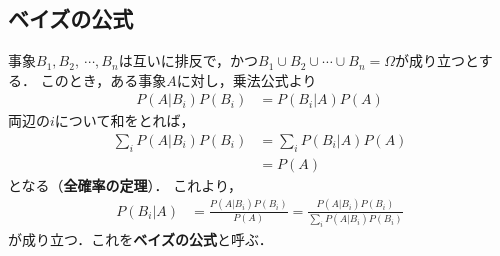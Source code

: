 %


\subsection{ベイズの公式}
%
事象$ B_{1}, B_{2},\ \cdots, B_{n} $は互いに排反で，かつ$ B_{1}\cup B_{2} \cup \cdots \cup B_{n} = \Omega $が成り立つとする．
%
このとき，ある事象$ A $に対し，乗法公式より
%
\begin{align*}
	P(A|B_{i})P(B_{i}) &= P(B_{i}|A)P(A)
\end{align*}
%
両辺の$ i $について和をとれば，
%
\begin{align*}
	\sum_{i} P(A|B_{i})P(B_{i}) &= \sum_{i} P(B_{i}|A)P(A) \\
	                            &= P(A)
\end{align*}
%
となる（\textbf{全確率の定理}）．
%
これより，
%
\begin{align*}
	P(B_{i}|A) &= \frac{P(A|B_{i})P(B_{i})}{P(A)} = \frac{P(A|B_{i})P(B_{i})}{\sum_{i} P(A|B_{i})P(B_{i})}
\end{align*}
%
が成り立つ．これを\textbf{ベイズの公式}と呼ぶ．
%

